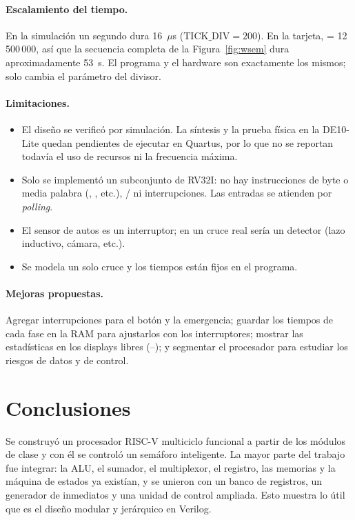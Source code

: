 \documentclass[12pt,letterpaper]{article}
\begin{document}
\paragraph{Escalamiento del tiempo.}
En la simulación un segundo dura 16~$\mu$s ($\text{TICK\_DIV} = 200$). En la tarjeta,
 = 12\,500\,000, así que la secuencia completa de la Figura~\ref{fig:wsem} dura
aproximadamente 53~s. El programa y el hardware son exactamente los mismos; solo cambia el
parámetro del divisor.

\paragraph{Limitaciones.}
\begin{itemize}[itemsep=0pt]
  \item El diseño se verificó por simulación. La síntesis y la prueba física en la DE10-Lite
        quedan pendientes de ejecutar en Quartus, por lo que no se reportan todavía el uso de
        recursos ni la frecuencia máxima.
  \item Solo se implementó un subconjunto de RV32I: no hay instrucciones de byte o media
        palabra (, , etc.), / ni interrupciones. Las entradas
        se atienden por \emph{polling}.
  \item El sensor de autos es un interruptor; en un cruce real sería un detector (lazo inductivo,
        cámara, etc.).
  \item Se modela un solo cruce y los tiempos están fijos en el programa.
\end{itemize}

\paragraph{Mejoras propuestas.}
Agregar interrupciones para el botón y la emergencia; guardar los tiempos de cada fase en la RAM
para ajustarlos con los interruptores; mostrar las estadísticas en los displays libres
(--); y segmentar el procesador para estudiar los riesgos de datos y de
control.

\section{Conclusiones}\label{sec:conclusiones}
Se construyó un procesador RISC-V multiciclo funcional a partir de los módulos de clase y con
él se controló un semáforo inteligente. La mayor parte del trabajo fue integrar: la ALU, el
sumador, el multiplexor, el registro, las memorias y la máquina de estados ya existían, y se
unieron con un banco de registros, un generador de inmediatos y una unidad de control ampliada.
Esto muestra lo útil que es el diseño modular y jerárquico en Verilog.
\end{document}
